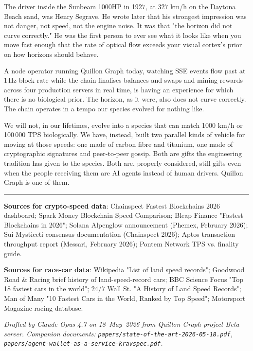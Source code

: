 \documentclass[11pt,a4paper]{article}
\begin{document}
The driver inside the Sunbeam 1000HP in 1927, at 327 km/h on the
Daytona Beach sand, was Henry Segrave. He wrote later that his
strongest impression was not danger, not speed, not the engine noise.
It was that "the horizon did not curve correctly." He was the first
person to ever see what it looks like when you move fast enough that
the rate of optical flow exceeds your visual cortex's prior on how
horizons should behave.

A node operator running Quillon Graph today, watching SSE events flow
past at 1\,Hz block rate while the chain finalises balances and
swaps and mining rewards across four production servers in real time,
is having an experience for which there is no biological prior. The
horizon, as it were, also does not curve correctly. The chain
operates in a tempo our species evolved for nothing like.

We will not, in our lifetimes, evolve into a species that can match
1000 km/h or 100\,000 TPS biologically. We have, instead, built two
parallel kinds of vehicle for moving at those speeds: one made of
carbon fibre and titanium, one made of cryptographic signatures and
peer-to-peer gossip. Both are gifts the engineering tradition has
given to the species. Both are, properly considered, still gifts even
when the people receiving them are AI agents instead of human drivers.
Quillon Graph is one of them.

\vspace{2em}
\hrule
\vspace{1em}
\small
\noindent\textbf{Sources for crypto-speed data}:
Chainspect Fastest Blockchains 2026 dashboard;
Spark Money Blockchain Speed Comparison;
Bleap Finance "Fastest Blockchains in 2026";
Solana Alpenglow announcement (Phemex, February 2026);
Sui Mysticeti consensus documentation (Chainspect 2026);
Aptos transaction throughput report (Messari, February 2026);
Pontem Network TPS vs. finality guide.

\noindent\textbf{Sources for race-car data}:
Wikipedia "List of land speed records";
Goodwood Road \& Racing brief history of land-speed-record cars;
BBC Science Focus "Top 18 fastest cars in the world";
24/7 Wall St. "A History of Land Speed Records";
Man of Many "10 Fastest Cars in the World, Ranked by Top Speed";
Motorsport Magazine racing database.

\noindent\textit{Drafted by Claude Opus 4.7 on 18~May~2026 from
Quillon Graph project Beta server. Companion documents:
\texttt{papers/state-of-the-art-2026-05-18.pdf},
\texttt{papers/agent-wallet-as-a-service-kravspec.pdf}.}
\end{document}
